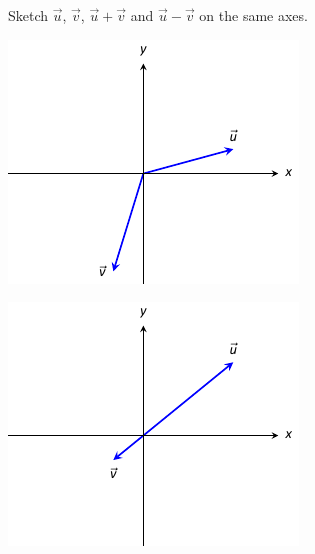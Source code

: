 
\begin{Exercise}[
name={},
title={}, 
difficulty=0,
origin={\cite{GHC}}]
Sketch $\vec u$, $\vec v$, $\vec u+\vec v$ and $\vec u-\vec v$ on the same axes.
\begin{multicols}{2}
\Question 
\begin{minipage}[m]{\linewidth}
\centering
\includegraphics[width=\linewidth]{vector_geometry/introduction_to_vectors/figures/fig10_02_ex_11}
\end{minipage}
\Question
\begin{minipage}[m]{\linewidth}
\centering
\includegraphics[width=\linewidth]{vector_geometry/introduction_to_vectors/figures/fig10_02_ex_13}

\end{minipage}
\end{multicols}
\end{Exercise}
